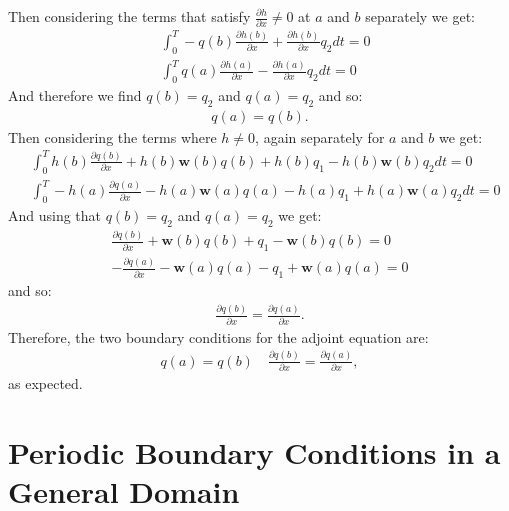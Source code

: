\documentclass[11pt, a4paper]{article}
\theoremstyle{definition}
\newcommand{\w}{\mathbf{w}}
\begin{document}
Then considering the terms that satisfy $\frac{\partial h}{\partial x} \neq 0$ at $a$ and $b$ separately we get:
\begin{align*}
	&\int_0^T -q(b) \frac{\partial h(b)}{\partial x} + \frac{\partial h(b)}{\partial x} q_2 dt= 0\\
	& \int_0^T q(a) \frac{\partial h (a)}{\partial x} - \frac{\partial h(a)}{\partial x}q_2 dt =0
\end{align*}
	And therefore we find $q(b) = q_2$ and $q(a) = q_2$ and so: 
	\begin{align*}
		q(a) = q(b).
	\end{align*}
Then considering the terms where $h \neq 0$, again separately for $a$ and $b$ we get:
\begin{align*}
	&\int_0^T  h(b)\frac{\partial q(b)}{\partial x} + h(b) \w(b) q(b) + h(b)q_1 - h(b)\w(b)q_2 dt = 0\\
	&\int_0^T - h(a)\frac{\partial q(a)}{\partial x} - h(a) \w(a) q(a) - h(a)q_1 + h(a)\w(a)q_2 dt = 0
\end{align*}
	And using that $q(b) = q_2$ and $q(a) = q_2$ we get:
	\begin{align*}
		\frac{\partial q(b)}{\partial x} + \w(b) q(b) + q_1 - \w(b)q(b)  = 0\\
		- \frac{\partial q(a)}{\partial x} - \w(a) q(a) - q_1 + \w(a)q(a)  = 0
	\end{align*}
	and so:
	\begin{align*}
		\frac{\partial q(b)}{\partial x}  = \frac{\partial q(a)}{\partial x}. 
	\end{align*}
	Therefore, the two boundary conditions for the adjoint equation are:
	\begin{align*}
		q(a) = q(b) \quad \frac{\partial q(b)}{\partial x}  = \frac{\partial q(a)}{\partial x},
	\end{align*}
	as expected.
		\section{Periodic Boundary Conditions in a General Domain}
	
\end{document}

